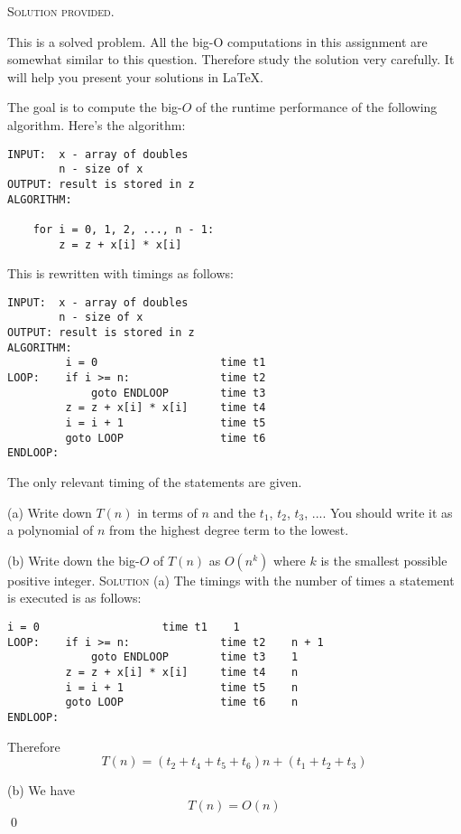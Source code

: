 
\textsc{Solution provided.}


This is a solved problem.
All the big-O computations in this assignment
are somewhat similar to this question.
Therefore study the solution very carefully.
It will help you present your solutions in \LaTeX.

The goal is to compute the big-$O$ of the runtime performance
of the following algorithm. 
Here's the algorithm:
\begin{Verbatim}[frame=single]
INPUT:  x - array of doubles
        n - size of x        
OUTPUT: result is stored in z
ALGORITHM:

    for i = 0, 1, 2, ..., n - 1:
        z = z + x[i] * x[i]
\end{Verbatim}
This is rewritten with timings as follows:
\begin{Verbatim}[frame=single]
INPUT:  x - array of doubles
        n - size of x
OUTPUT: result is stored in z
ALGORITHM:                      
         i = 0                   time t1     
LOOP:    if i >= n:              time t2      
             goto ENDLOOP        time t3      
         z = z + x[i] * x[i]     time t4      
         i = i + 1               time t5
         goto LOOP               time t6
ENDLOOP:
\end{Verbatim}
The only relevant timing of the statements are given.


(a) Write down $T(n)$ in terms of $n$ and the 
$t_1$, $t_2$, $t_3$, ....
You should write it as a polynomial of $n$ from the highest
degree term to the lowest.

(b) Write down the big-$O$ of $T(n)$ as $O(n^k)$
where $k$ is the smallest possible  positive integer.
\newpage
\textsc{Solution}
(a)
The timings with the number of times a statement is executed is as follows:
\begin{Verbatim}[frame=single]
         i = 0                   time t1    1
LOOP:    if i >= n:              time t2    n + 1
             goto ENDLOOP        time t3    1 
         z = z + x[i] * x[i]     time t4    n
         i = i + 1               time t5    n
         goto LOOP               time t6    n
ENDLOOP:
\end{Verbatim}
Therefore
\[
T(n) = (t_2 + t_4 + t_5 + t_6)n + (t_1 + t_2 + t_3)
\]

(b)
We have
\[
T(n) = O(n)
\]
\qed
